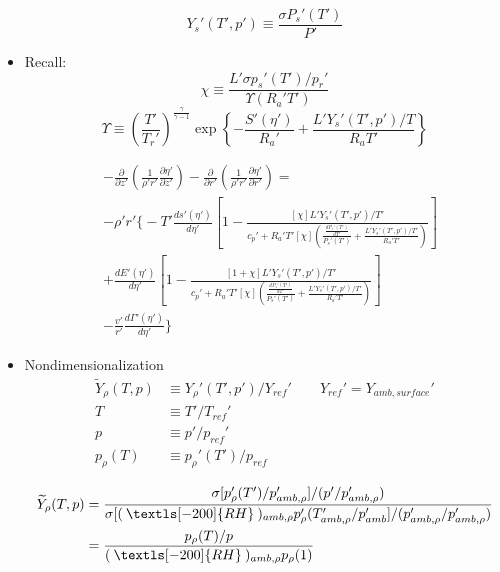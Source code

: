 \documentclass[preprint, prX]{revtex4}
\newcommand{\gogmo}{\frac{\gamma}{\gamma-1}}
\newcommand{\pfrac}[2]{\left(\frac{#1}{#2}\right)}
\newcommand{\dd}[2]{\frac{d#1}{d#2}}
\newcommand{\pd}[2]{\frac{\partial#1}{\partial#2}}
\newcommand{\rh}{\:\textls[-200]{RH}\:}
\begin{document}
\begin{itemize}
\begin{equation}
Y_s'(T',p') \equiv \frac{\sigma P_s'(T')}{P'}
\end{equation}

\item
Recall:
\begin{equation}
\chi \equiv \frac{L'\sigma p_s'(T')/p_r'}{\Upsilon(R_a' T')} 
\end{equation}
\begin{equation}
\Upsilon \equiv \pfrac{T'}{T_r'}^\gogmo \exp \left\{ -\frac{S'(\eta')}{R_a'} +\frac{L'Y_s'(T',p')/T}{R_a T'} \right\}
\end{equation}

\begin{equation}
\begin{split}
&-\pd{}{z'}\left( \frac{1}{\rho' r'} \pd{\eta'}{z'}\right) - \pd{}{r'}\left(\frac{1}{\rho'r'} \pd{\eta'}{r'}\right) =\\
&-\rho'r' \Bigg\{ -T' \dd{s'(\eta')}{\eta'} \left[ 1 - \frac{[\chi] L'Y_s'(T',p')/T'}{c_p' + R_a'T'[\chi] \left( \frac{\dd{P_s'(T')}{T'}}{P_s'(T')} +\frac{L'Y_s'(T',p')/T'}{R_a'T'} \right)}\right]  \\
& + \dd{E'(\eta')}{\eta'} \left[1 - \frac{[1+\chi] L'Y_s'(T',p')/T'}{c_p' + R_a'T'[\chi] \left( \frac{\dd{P_s'(T')}{T'}}{P_s'(T')} +\frac{L'Y_s'(T',p')/T'}{R_a'T'} \right)} \right]  \\
&- \frac{v'}{r'}\dd{\Gamma'(\eta')}{\eta'} \Bigg\}
\end{split}
\end{equation}

\item
Nondimensionalization 
\begin{equation}
\begin{split}
\widetilde{Y}_\rho(T,p) &\equiv Y_\rho'(T',p') / Y_{ref}'  \qquad Y_{ref}' = Y_{amb,surface}' \\
T &\equiv T'/T_{ref}' \\
p &\equiv p'/p_{ref}' \\
p_\rho(T) &\equiv p_\rho'(T') / p_{ref}
\end{split}
\end{equation}

\begin{equation}
\begin{split}
\widetilde{Y}_\rho(T,p) &= \frac{\sigma[p_\rho'(T')/p_{amb,\rho}' ]/(p'/p_{amb,\rho}')}{\sigma[(\rh)_{amb,\rho} p_\rho'(T_{amb,\rho}'/p_{amb}']/(p_{amb,\rho}'/p_{amb,\rho}')} \\
&= \frac{p_\rho(T)/p}{(\rh)_{amb,\rho}p_\rho(1)}\\
\end{split}
\end{equation}


\end{itemize}
\end{document}
